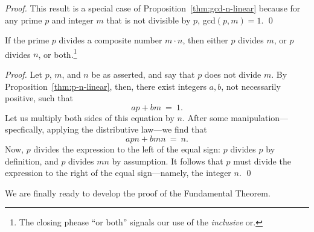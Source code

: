 \begin{proof}
This result is a special case of Proposition~\ref{thm:gcd-n-linear}
because for any prime $p$ and integer $m$ that is not divisible by
$p$, {\sc gcd}$(p, m) = 1$.
\qed
\end{proof}

\begin{prop}
\label{thm:p-divides-onefactor}
If the prime $p$ divides a composite number $m \cdot n$, then either
$p$ divides $m$, or $p$ divides $n$, or both.\footnote{The closing
  phease ``or both'' signals our use of the {\em inclusive} or.}
\end{prop}

\begin{proof}
Let $p$, $m$, and $n$ be as asserted, and say that $p$ does not divide
$m$.  By Proposition~\ref{thm:p-n-linear}, then, there exist integers
$a, b$, not necessarily positive, such that
\[ ap + bm \ = \ 1. \]
Let us multiply both sides of this equation by $n$.  After some
manipulation---specfically, applying the distributive law---we find
that
\[ apn + bmn \ = \ n. \]
Now, $p$ divides the expression to the left of the equal sign: $p$
divides $p$ by definition, and $p$ divides $mn$ by assumption.  It
follows that $p$ must divide the expression to the right of the equal
sign---namely, the integer $n$.  \qed
\end{proof}

We are finally ready to develop the proof of the Fundamental Theorem.

